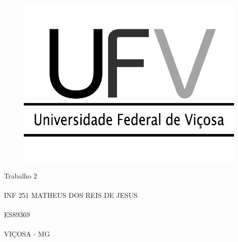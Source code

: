 \documentclass[tikz,12pt]{article}
\begin{document}
\begin{center}

\author{Matheus dos Reis <matheusdrdj@gmail.com>}

\begin{center}
    \begin{figure}
        \centering
        \includegraphics[scale=0.2]{./doc/logoufv.png}
    \end{figure}
    \centering
    \vfill
    \fontsize{32pt}{1.5} 
    \selectfont Trabalho 2
    \paragraph{}
    \selectfont INF 251
    \vfill
    \fontsize{14pt}{1.5}
    \selectfont MATHEUS DOS REIS DE JESUS
    \paragraph{}
    \selectfont ES89369
    \paragraph{}
    \selectfont VIÇOSA - MG
\end{center}


\newpage


\end{center}
\end{document}
